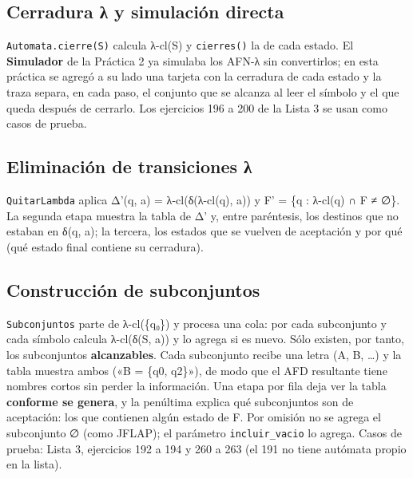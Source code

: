 \hypertarget{cerradura-ux3bb-y-simulaciuxf3n-directa}{%
\subsection{Cerradura λ y simulación directa}\label{cerradura-ux3bb-y-simulaciuxf3n-directa}}

\texttt{Automata.cierre(S)} calcula λ-cl(S) y \texttt{cierres()} la de cada estado. El \textbf{Simulador} de la Práctica 2 ya simulaba los AFN-λ sin convertirlos; en esta práctica se agregó a su lado una tarjeta con la cerradura de cada estado y la traza separa, en cada paso, el conjunto que se alcanza al leer el símbolo y el que queda después de cerrarlo. Los ejercicios 196 a 200 de la Lista 3 se usan como casos de prueba.


\hypertarget{eliminaciuxf3n-de-transiciones-ux3bb}{%
\subsection{Eliminación de transiciones λ}\label{eliminaciuxf3n-de-transiciones-ux3bb}}

\texttt{QuitarLambda} aplica Δ'(q, a) = λ-cl(δ(λ-cl(q), a)) y F' = \{q : λ-cl(q) ∩ F ≠ ∅\}. La segunda etapa muestra la tabla de Δ' y, entre paréntesis, los destinos que no estaban en δ(q, a); la tercera, los estados que se vuelven de aceptación y por qué (qué estado final contiene su cerradura).


\hypertarget{construcciuxf3n-de-subconjuntos}{%
\subsection{Construcción de subconjuntos}\label{construcciuxf3n-de-subconjuntos}}

\texttt{Subconjuntos} parte de λ-cl(\{q₀\}) y procesa una cola: por cada subconjunto y cada símbolo calcula λ-cl(δ(S, a)) y lo agrega si es nuevo. Sólo existen, por tanto, los subconjuntos \textbf{alcanzables}. Cada subconjunto recibe una letra (A, B, \ldots) y la tabla muestra ambos («B = \{q0, q2\}»), de modo que el AFD resultante tiene nombres cortos sin perder la información. Una etapa por fila deja ver la tabla \textbf{conforme se genera}, y la penúltima explica qué subconjuntos son de aceptación: los que contienen algún estado de F. Por omisión no se agrega el subconjunto ∅ (como JFLAP); el parámetro \texttt{incluir\_vacio} lo agrega. Casos de prueba: Lista 3, ejercicios 192 a 194 y 260 a 263 (el 191 no tiene autómata propio en la lista).

